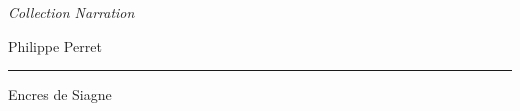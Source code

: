 
\begin{titlepage}
	\begin{center}\LARGE
		\textit{Collection Narration}
	\end{center}
	\begin{flushright}
		Philippe Perret
	\end{flushright}
	\hrule
	\begin{flushleft}\huge\bfseries
		\titrelivre{}
	\end{flushleft}
	\begin{flushleft}\itshape\small
		\soustitrelivre
	\end{flushleft}
	\begin{center}
		Encres de Siagne
	\end{center}
\end{titlepage}

